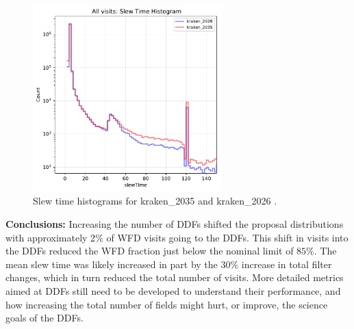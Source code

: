 \documentclass[DM,authoryear,toc]{lsstdoc}
\begin{document}
\begin{figure}[ht]
\centering
\includegraphics[width=0.65\textwidth]{figures/kraken_2035_kraken_2026_Slew_Time_Histogram_All_visits_ONED_ComboBinnedData.pdf}
\caption{Slew time histograms for kraken\_2035 and kraken\_2026 .}
\label{fig:slew-2035}
\end{figure}

\textbf{Conclusions:} Increasing the number of DDFs shifted the proposal distributions with approximately 2$\%$ of WFD visits going
to the DDFs. This shift in visits into the DDFs reduced the WFD fraction just below the nominal limit of $85\%$. The mean slew time
was likely increased in part by the 30$\%$  increase in total filter changes, which in turn reduced the total number of visits. More detailed
metrics aimed at DDFs still need to be developed to understand their performance, and how increasing the total number of fields might
hurt, or improve, the science goals of the DDFs.
\end{document}
